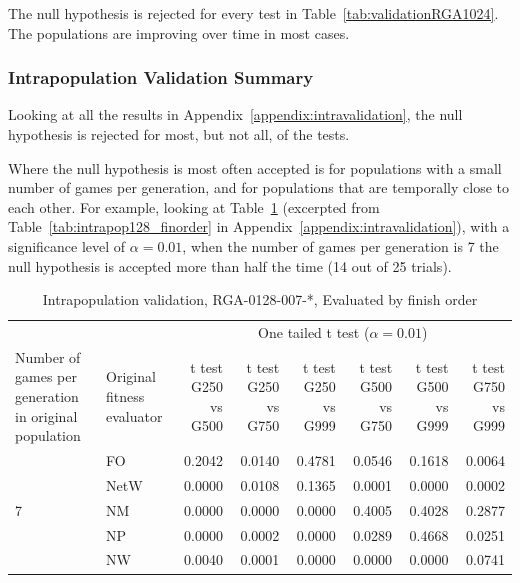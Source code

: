 The null hypothesis is rejected for every test in
Table~\ref{tab:validationRGA1024}. The populations are improving over time in
most cases.

\subsubsection{Intrapopulation Validation Summary}

Looking at all the results in Appendix~\ref{appendix:intravalidation}, 
the null hypothesis is rejected for most, but not all, of the tests.

Where the null hypothesis is most often accepted is for populations with a small
number of games per generation, and for populations that are temporally close to
each other. For example, looking at Table~\ref{tab:validationRGA0128-007}
(excerpted from Table~\ref{tab:intrapop128_finorder} in
Appendix~\ref{appendix:intravalidation}), with a significance level of
\(\alpha=0.01\), when the number of games per generation is 7 the null
hypothesis is accepted more than half the time (14 out of 25 trials).

\begin{table}[htbp]
  \centering
  \caption{Intrapopulation validation, RGA-0128-007-*, Evaluated by finish order}
    \begin{tabularx}{\linewidth}{|p{1in}|p{1in}|r|r|r|r|r|r|}
    \cline{3-8}
    \multicolumn{1}{l}{} &  & \multicolumn{6}{c|}{One tailed t test (\(\alpha=0.01\))} \\
    \cline{1-8}
      Number of games per generation in original population
    & Original fitness evaluator
    & \multicolumn{1}{X|}{t test G250 vs G500} 
    & \multicolumn{1}{X|}{t test G250 vs G750} 
    & \multicolumn{1}{X|}{t test G250 vs G999} 
    & \multicolumn{1}{X|}{t test G500 vs G750} 
    & \multicolumn{1}{X|}{t test G500 vs G999} 
    & \multicolumn{1}{X|}{t test G750 vs G999} \\
    \cline{1-8}
    \multirow{5}{*}{7} 
      & FO & 0.2042 & 0.0140 & 0.4781 & 0.0546 & 0.1618 & 0.0064 \\
\cline{2-8}             
      & NetW & 0.0000 & 0.0108 & 0.1365 & 0.0001 & 0.0000 & 0.0002 \\
\cline{2-8}             
      & NM & 0.0000 & 0.0000 & 0.0000 & 0.4005 & 0.4028 & 0.2877 \\
\cline{2-8}             
      & NP & 0.0000 & 0.0002 & 0.0000 & 0.0289 & 0.4668 & 0.0251 \\
\cline{2-8}             
      & NW & 0.0040 & 0.0001 & 0.0000 & 0.0000 & 0.0000 & 0.0741 \\
    \cline{1-8}
    \end{tabularx}%
  \label{tab:validationRGA0128-007}%
\end{table}%

